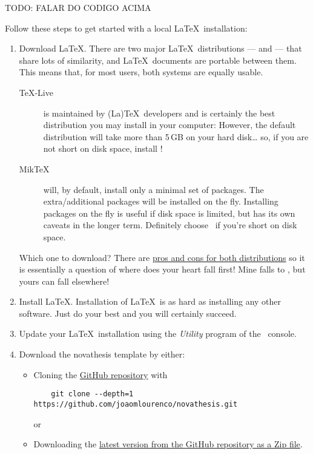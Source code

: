 {TODO: FALAR DO CODIGO ACIMA

\iffalse
Follow these steps to get started with a local \LaTeX\ installation:

\begin{enumerate}
  \item Download \LaTeX.  There are two major \LaTeX\ distributions — \href{https://miktex.org/}{\MikTeX} and \href{https://www.tug.org/texlive/}{\TeXLive} — that share lots of similarity, and \LaTeX\ documents are portable between them. This means that, for most users, both systems are equally usable.
  \begin{description}
    \item [\TeX-Live] is maintained by (La)\TeX\ developers and is certainly the best distribution you may install in your computer:  However, the default distribution will take more than 5\,GB on your hard disk… so, if you are not short on disk space, install \TeXLive!
    \item[Mik\TeX] will, by default, install only a minimal set of packages. The extra/additional packages will be installed on the fly.  Installing packages on the fly is useful if disk space is limited, but has its own caveats in the longer term.  Definitely choose \MikTeX\ if you're short on disk space.
  \end{description}
  Which one to download?  There are \href{https://tex.stackexchange.com/questions/20036/what-are-the-advantages-of-tex-live-over-miktex}{pros and cons for both distributions} so it is essentially a question of where does your heart fall first!  Mine falls to \TeXLive, but yours can fall elsewhere!  \emojiSmile
  \item Install \LaTeX. Installation of \LaTeX\ is as hard as installing any other software.  Just do your best and you will certainly succeed. 
  \item Update your \LaTeX\ installation using the \emph{\TeXLive Utility} program of the \MikTeX\ console.
  \item Download the \gls{novathesis} template by either:
  \begin{itemize}
    \item Cloning the \href{https://github.com/joaomlourenco/novathesis}{GitHub repository} with
    \begin{verbatim}    git clone --depth=1 https://github.com/joaomlourenco/novathesis.git\end{verbatim}
    or
    \item Downloading the \href{https://github.com/joaomlourenco/novathesis/archive/main.zip}{latest version from the GitHub repository as a Zip file}.
  \end{itemize}


\end{enumerate}}

